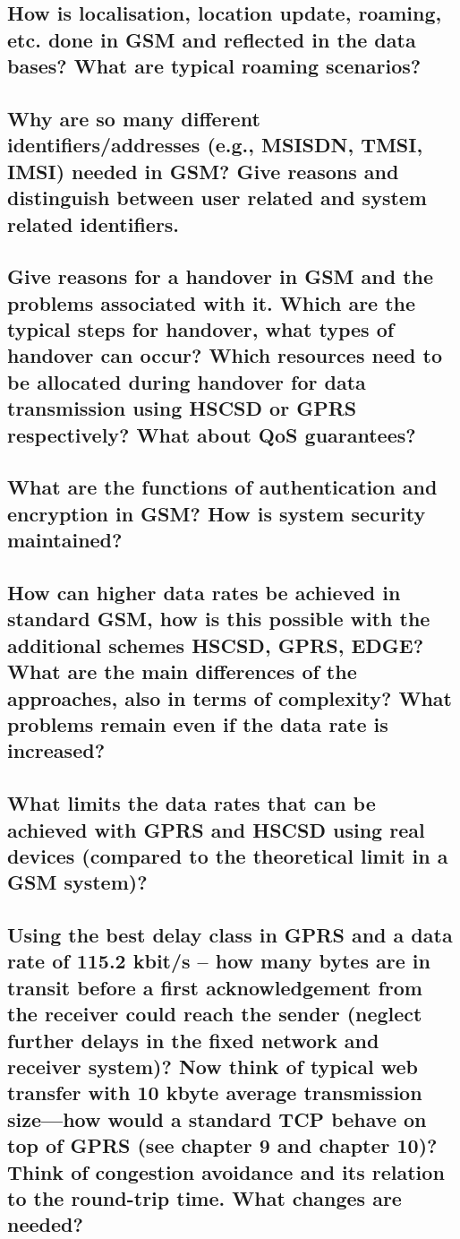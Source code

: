 \subsection{How is localisation, location update, roaming, etc. done in GSM and reflected in the
data bases? What are typical roaming scenarios?}

\subsection{Why are so many different identifiers/addresses (e.g., MSISDN, TMSI, IMSI) needed
in GSM? Give reasons and distinguish between user related and system related
identifiers.}

\subsection{Give reasons for a handover in GSM and the problems associated with it. Which are
the typical steps for handover, what types of handover can occur? Which resources
need to be allocated during handover for data transmission using HSCSD or GPRS
respectively? What about QoS guarantees?}

\subsection{What are the functions of authentication and encryption in GSM? How is system
security maintained?}

\subsection{How can higher data rates be achieved in standard GSM, how is this possible with
the additional schemes HSCSD, GPRS, EDGE? What are the main differences of the
approaches, also in terms of complexity? What problems remain even if the data rate
is increased?}

\subsection{What limits the data rates that can be achieved with GPRS and HSCSD using real
devices (compared to the theoretical limit in a GSM system)?}

\subsection{Using the best delay class in GPRS and a data rate of 115.2 kbit/s – how many bytes
are in transit before a first acknowledgement from the receiver could reach the sender
(neglect further delays in the fixed network and receiver system)? Now think of typical
web transfer with 10 kbyte average transmission size—how would a standard TCP
behave on top of GPRS (see chapter 9 and chapter 10)? Think of congestion
avoidance and its relation to the round-trip time. What changes are needed?}

